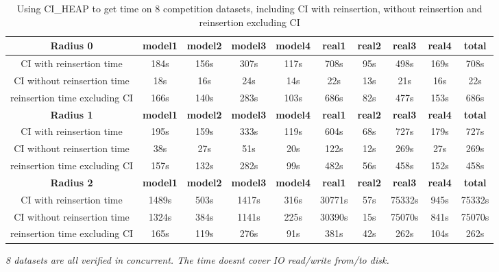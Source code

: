 \documentclass{article}
\begin{document}
	\begin{table}[!htbp]
	\begin{adjustwidth}{-2cm}{}		
		\begin{threeparttable}		
			\centering
			\caption{Using CI\_HEAP to get time on 8 competition datasets, including CI with reinsertion, without reinsertion and reinsertion excluding CI}
			\label{tab:table11}
			\begin{tabular}{|c|c|c|c|c|c|c|c|c|c|}
				\hline
				\textbf{Radius 0} & \textbf{model1} & \textbf{model2} & \textbf{model3} & \textbf{model4} & \textbf{real1} & \textbf{real2} & \textbf{real3} & \textbf{real4} & \textbf{total} \\ \hline
				
				CI with reinsertion time                 & 184s&156s&307s&117s&708s&95s&498s&169s&708s         \\ \hline
				CI without reinsertion time                             & 18s&16s&24s&14s&22s&13s&21s&16s&22s            \\ \hline
				reinsertion time excluding CI                         & 166s&140s&283s&103s&686s&82s&477s&153s&686s               \\ \hline
				
				\textbf{Radius 1} & \textbf{model1} & \textbf{model2} & \textbf{model3} & \textbf{model4} & \textbf{real1} & \textbf{real2} & \textbf{real3} & \textbf{real4} & \textbf{total} \\ \hline
				
				CI with reinsertion time                 & 195s&159s&333s&119s&604s&68s&727s&179s&727s         \\ \hline
				CI without reinsertion time                             & 38s&27s&51s&20s&122s&12s&269s&27s&269s            \\ \hline
				reinsertion time excluding CI                         & 157s&132s&282s&99s&482s&56s&458s&152s&458s               \\ \hline					
				
				\textbf{Radius 2} & \textbf{model1} & \textbf{model2} & \textbf{model3} & \textbf{model4} & \textbf{real1} & \textbf{real2} & \textbf{real3} & \textbf{real4} & \textbf{total} \\ \hline
				CI with reinsertion time                 & 1489s&503s&1417s&316s&30771s&57s&75332s&945s&75332s         \\ \hline
				CI without reinsertion time                             & 1324s&384s&1141s&225s&30390s&15s&75070s&841s&75070s         \\ \hline
				reinsertion time excluding CI                         & 165s&119s&276s&91s&381s&42s&262s&104s&262s                \\ \hline				
			\end{tabular}
			\begin{tablenotes}
				\small
				\item\textit{ 8 datasets are all verified in concurrent. The time doesn\textquotesingle t cover IO read/write from/to disk.}
			\end{tablenotes}			
		\end{threeparttable}
	\end{adjustwidth}	
	\end{table}	
\end{document}

